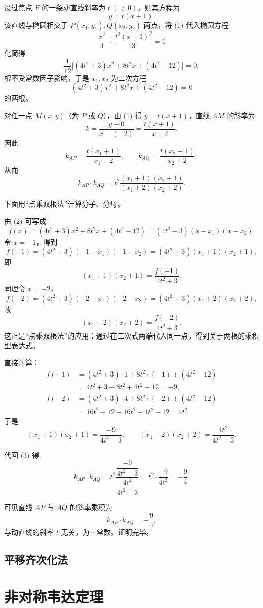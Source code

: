 \documentclass{ctexart}
\begin{document}
设过焦点 $F$ 的一条动直线斜率为 $t\ (\neq0)$，则其方程为
\[
y=t(x+1). \tag{1}
\]
该直线与椭圆相交于 $P(x_1,y_1),Q(x_2,y_2)$ 两点，将 (1) 代入椭圆方程
\[
\frac{x^{2}}{4}+\frac{t^{2}(x+1)^{2}}{3}=1
\]
化简得
\[
\frac{1}{12}\Big[(4t^{2}+3)x^{2}+8t^{2}x+(4t^{2}-12)\Big]=0,
\]
根不受常数因子影响，于是 $x_1,x_2$ 为二次方程
\[
(4t^{2}+3)x^{2}+8t^{2}x+(4t^{2}-12)=0 \tag{2}
\]
的两根。

对任一点 $M(x,y)$（为 $P$ 或 $Q$），由 (1) 得 $y=t(x+1)$，直线 $AM$ 的斜率为
\[
k=\frac{y-0}{x-(-2)}=\frac{t(x+1)}{x+2}.
\]
因此
\[
k_{AP}=\frac{t(x_1+1)}{x_1+2},\qquad
k_{AQ}=\frac{t(x_2+1)}{x_2+2},
\]
从而
\[
k_{AP}\cdot k_{AQ}
=t^{2}\frac{(x_1+1)(x_2+1)}{(x_1+2)(x_2+2)}. \tag{3}
\]

下面用“点乘双根法”计算分子、分母。

由 (2) 可写成
\[
f(x)=(4t^{2}+3)x^{2}+8t^{2}x+(4t^{2}-12)
=(4t^{2}+3)(x-x_1)(x-x_2).
\]
令 $x=-1$，得到
\[
f(-1)=(4t^{2}+3)(-1-x_1)(-1-x_2)=(4t^{2}+3)(x_1+1)(x_2+1),
\]
即
\[
(x_1+1)(x_2+1)=\frac{f(-1)}{4t^{2}+3}.
\]
同理令 $x=-2$，
\[
f(-2)=(4t^{2}+3)(-2-x_1)(-2-x_2)=(4t^{2}+3)(x_1+2)(x_2+2),
\]
故
\[
(x_1+2)(x_2+2)=\frac{f(-2)}{4t^{2}+3}.
\]
这正是“点乘双根法”的应用：通过在二次式两端代入同一点，得到关于两根的乘积型表达式。

直接计算：
\[
\begin{aligned}
	f(-1)
	&=(4t^{2}+3)\cdot1+8t^{2}\cdot(-1)+(4t^{2}-12)  \\
	&=4t^{2}+3-8t^{2}+4t^{2}-12
	=-9, \\[4pt]
	f(-2)
	&=(4t^{2}+3)\cdot4+8t^{2}\cdot(-2)+(4t^{2}-12) \\
	&=16t^{2}+12-16t^{2}+4t^{2}-12
	=4t^{2}.
\end{aligned}
\]
于是
\[
(x_1+1)(x_2+1)=\frac{-9}{4t^{2}+3},\qquad
(x_1+2)(x_2+2)=\frac{4t^{2}}{4t^{2}+3}.
\]

代回 (3) 得
\[
k_{AP}\cdot k_{AQ}
=t^{2}\frac{\dfrac{-9}{4t^{2}+3}}{\dfrac{4t^{2}}{4t^{2}+3}}
=t^{2}\cdot\frac{-9}{4t^{2}}
=-\frac{9}{4}.
\]

可见直线 $AP$ 与 $AQ$ 的斜率乘积为
\[
k_{AP}\cdot k_{AQ}=-\frac{9}{4},
\]
与动直线的斜率 $t$ 无关，为一常数。证明完毕。

	\subsection{平移齐次化法}
	
	
		\section{非对称韦达定理}
	
\end{document}
